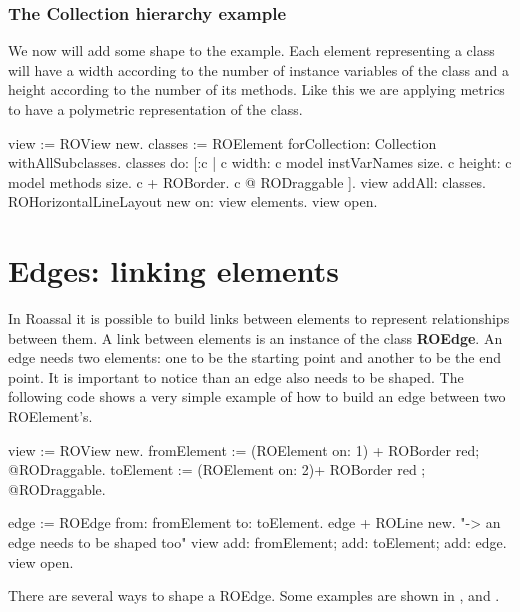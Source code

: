 \documentclass[a4paper,10pt,twoside]{book}
\begin{document}
\subsubsection*{The Collection hierarchy example}
We now will add some shape to the  example. Each element representing a class will have a width according to the number of instance variables of the class and a height according to the number of its methods. Like this we are applying metrics to have a polymetric representation of the class.

\begin{code}{}
view := ROView new.
classes := ROElement forCollection: Collection withAllSubclasses.
classes do: [:c | 
	c width: c model instVarNames size.
	c height: c model methods size.
	c + ROBorder. 
	c @ RODraggable ].
view addAll: classes.
ROHorizontalLineLayout new on: view elements.
view open.
\end{code}


\section{Edges: linking elements} 

In Roassal it is possible to build links between elements to represent relationships between them. A link between elements is an instance of the class \textbf{ROEdge}. An edge needs two elements: one to be the starting point and another to be the end point. It is important to notice than an edge also needs to be shaped. The following code shows a very simple example of how to build an edge between two ROElement's.

\begin{code}{}
view := ROView new.
fromElement := (ROElement on: 1) + ROBorder red; @RODraggable.
toElement := (ROElement on: 2)+ ROBorder red ; @RODraggable.

edge := ROEdge from: fromElement to: toElement.
edge + ROLine new. "-> an edge needs to be shaped too"
view 
	add: fromElement; 
	add: toElement; 
	add: edge.
view open.
\end{code}

There are several ways to shape a ROEdge. Some examples are shown in ,  and .
\end{document}
